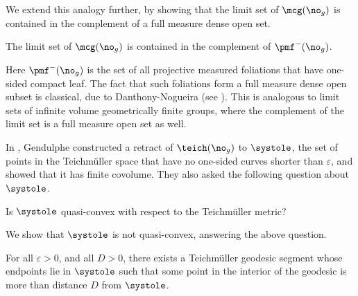 \documentclass[12pt, reqno]{amsart}
\begin{document}
We extend this analogy further, by showing that the limit set of $\mcg(\no_g)$ is contained in the complement of a full measure dense open set.
\begingroup
\def\thetheorem{\ref{cor:geolimset}}
\begin{theorem}
  The limit set of $\mcg(\no_g)$ is contained in the complement of $\pmf^-(\no_g)$.
\end{theorem}
\addtocounter{theorem}{-1}
\endgroup
Here $\pmf^-(\no_g)$ is the set of all projective measured foliations that have one-sided compact leaf.
The fact that such foliations form a full measure dense open subset is classical, due to Danthony-Nogueira (see \cite{ASENS_1990_4_23_3_469_0}).
This is analogous to limit sets of infinite volume geometrically finite groups, where the complement of the limit set is a full measure open set as well.

In \cite{gendulphe_whats_2017}, Gendulphe constructed a retract of $\teich(\no_g)$ to $\systole$, the set of points in the Teichm\"uller space that have no one-sided curves shorter than $\varepsilon$, and showed that it has finite covolume.
They also asked the following question about $\systole$.
\begin{unquestion}
  Is $\systole$ quasi-convex with respect to the Teichmüller metric?
\end{unquestion}
We show that ${\systole}$ is not quasi-convex, answering the above question.
\begingroup
\def\thetheorem{\ref{thm:qc-fail}}
\begin{theorem}
  For all $\varepsilon > 0$, and all $D > 0$, there exists a Teichm\"uller geodesic segment whose endpoints lie in ${\systole}$ such that some point in the interior of the geodesic is more than distance $D$ from $\systole$.
\end{theorem}
\addtocounter{theorem}{-1}
\endgroup
\end{document}
